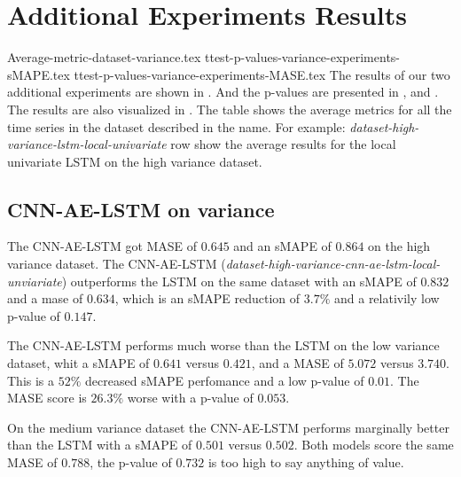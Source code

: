 \section{Additional Experiments Results}
\label{section:Results:AdditionalExperimentResults}

{Average-metric-dataset-variance.tex}
{ttest-p-values-variance-experiments-sMAPE.tex}
{ttest-p-values-variance-experiments-MASE.tex}
The results of our two additional experiments are shown in .
And the p-values are presented in ,
and .
The results are also visualized in .
The table shows the average metrics for all the time series in the dataset described in the name.
For example: \textit{dataset-high-variance-lstm-local-univariate} row show the average
results for the local univariate LSTM on the high variance dataset.

\subsection{CNN-AE-LSTM on variance}
The CNN-AE-LSTM got MASE of $0.645$ and an sMAPE of $0.864$
on the high variance dataset. The CNN-AE-LSTM (\textit{dataset-high-variance-cnn-ae-lstm-local-unviariate}) outperforms the LSTM on
the same dataset with an sMAPE of $0.832$ and a mase of $0.634$, which is an sMAPE reduction of $3.7\%$
and a relativily low p-value of $0.147$.

The CNN-AE-LSTM performs much worse than the LSTM on the low variance dataset,
whit a sMAPE of $0.641$ versus $0.421$, and a MASE of $5.072$ versus $3.740$.
This is a $52\%$ decreased sMAPE perfomance and a low p-value of $0.01$.
The MASE score is $26.3\%$ worse with a p-value of $0.053$.

On the medium variance dataset the CNN-AE-LSTM performs marginally better than the LSTM
with a sMAPE of $0.501$ versus $0.502$. Both models score the same MASE of $0.788$, the
p-value of $0.732$ is too high to say anything of value.



